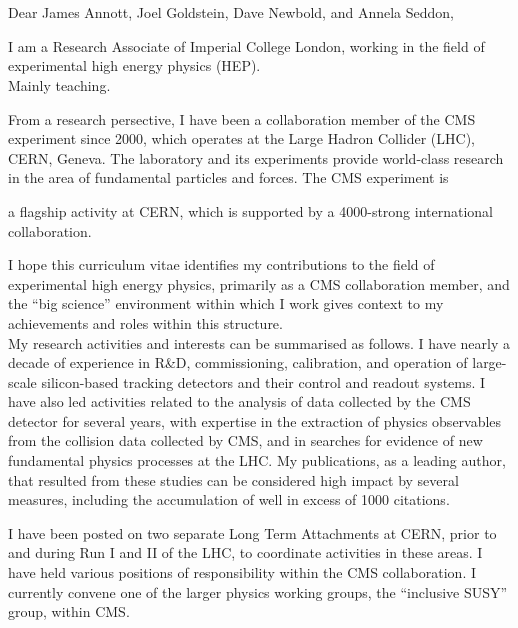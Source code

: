 \section{}

Dear James Annott, Joel Goldstein, Dave Newbold, and Annela Seddon,

I am a Research Associate of Imperial College London, working in the
field of experimental high energy physics (HEP). \\


Mainly teaching.


From a research persective, I have been a collaboration member of the
CMS experiment since 2000, which operates at the Large Hadron Collider
(LHC), CERN, Geneva. The laboratory and its experiments provide
world-class research in the area of fundamental particles and
forces. The CMS experiment is 

a flagship activity at CERN, which is
supported by a 4000-strong international collaboration. 

I hope this curriculum vitae identifies my contributions to the field
of experimental high energy physics, primarily as a CMS collaboration
member, and the ``big science'' environment within which I work gives
context to my achievements and roles within this
structure. \\

My research activities and interests can be summarised as follows. I
have nearly a decade of experience in R\&D, commissioning,
calibration, and operation of large-scale silicon-based tracking
detectors and their control and readout systems. I have also led
activities related to the analysis of data collected by the CMS
detector for several years, with expertise in the extraction of
physics observables from the collision data collected by CMS, and in
searches for evidence of new fundamental physics processes at the
LHC. My publications, as a leading author, that resulted from these
studies can be considered high impact by several measures, including
the accumulation of well in excess of 1000 citations. 

I have been posted on two separate Long Term Attachments at CERN,
prior to and during Run I and II of the LHC, to coordinate activities
in these areas. I have held various positions of responsibility within
the CMS collaboration. I currently convene one of the larger physics
working groups, the ``inclusive SUSY'' group, within CMS.

